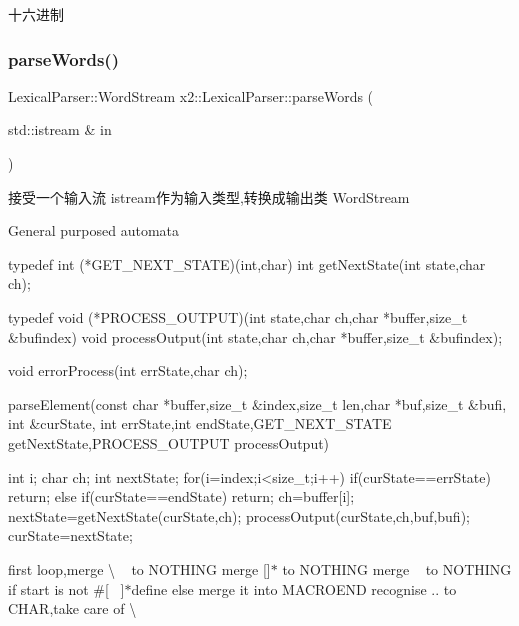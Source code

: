 十六进制 \mbox{\label{classx2_1_1_lexical_parser_ae60c0630386d1f6619fb2ba82955934e}} 
\subsubsection{\texorpdfstring{parse\+Words()}{parseWords()}}
{\footnotesize\ttfamily Lexical\+Parser\+::\+Word\+Stream x2\+::\+Lexical\+Parser\+::parse\+Words (\begin{DoxyParamCaption}\item[{std\+::istream \&}]{in }\end{DoxyParamCaption})}

接受一个输入流 istream作为输入类型,转换成输出类 Word\+Stream

General purposed automata \begin{DoxyVerb}typedef int (*GET_NEXT_STATE)(int,char)
    int getNextState(int state,char ch);

    typedef void (*PROCESS_OUTPUT)(int state,char ch,char *buffer,size_t &bufindex)
    void processOutput(int state,char ch,char *buffer,size_t &bufindex);

    void errorProcess(int errState,char ch);


    parseElement(const char *buffer,size_t &index,size_t len,char *buf,size_t &bufi,
    int &curState,
    int errState,int endState,GET_NEXT_STATE getNextState,PROCESS_OUTPUT processOutput)
    {
        int i;
        char ch;
        int nextState;
    for(i=index;i<size_t;i++)
    {
        if(curState==errState)
        {
            return;
        }else if(curState==endState){
            return;
        }
        ch=buffer[i];
        nextState=getNextState(curState,ch);
        processOutput(curState,ch,buf,bufi);
        curState=nextState;
    }


    }\end{DoxyVerb}


first loop,merge \textquotesingle{}\textbackslash{}\textquotesingle{} \textquotesingle{}~\newline
\textquotesingle{} to N\+O\+T\+H\+I\+NG merge \mbox{[}\mbox{]}$\ast$ to N\+O\+T\+H\+I\+NG merge ~\newline
 to N\+O\+T\+H\+I\+NG if start is not \#\mbox{[}~\newline
\mbox{]}$\ast$define else merge it into M\+A\+C\+R\+O\+E\+ND recognise \textquotesingle{}..\textquotesingle{} to C\+H\+AR,take care of \textbackslash{}\textquotesingle{}

